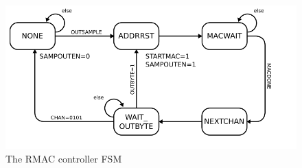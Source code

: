 \begin{figure}
\label{rmaccontrollerfsm}
\includegraphics[scale=0.7]{RMACcontrol.fsm.svg}
\caption{The RMAC controller FSM}
\end{figure}
